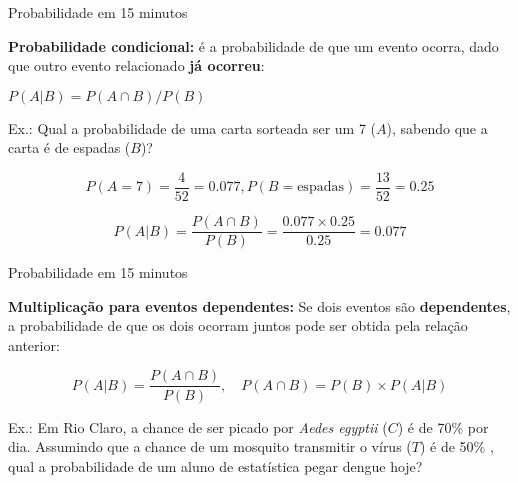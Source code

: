 \documentclass{beamer}\usepackage[]{graphicx}\usepackage[]{color}
\begin{document}
\begin{frame}{Probabilidade em 15 minutos}

\begin{small}

\textbf{Probabilidade condicional:} é a probabilidade de que um evento ocorra, dado que outro evento relacionado \textbf{já ocorreu}:

$P(A|B) = P(A \cap B)/P(B)$

\alert{Ex.:} Qual a probabilidade de uma carta sorteada ser um 7 ($A$), sabendo que a carta é de espadas ($B$)? 

\begin{equation*}
    P(A=7)= \frac{4}{52} = 0.077, P(B = \text{espadas}) = \frac{13}{52} = 0.25
\end{equation*}

\begin{equation*}
    P(A|B) = \frac{P(A \cap B)}{P(B)} = \frac{0.077 \times 0.25}{0.25} = 0.077
\end{equation*}


\end{small}

\end{frame} 



\begin{frame}{Probabilidade em 15 minutos}

\textbf{Multiplicação para eventos dependentes:} Se dois eventos são \textbf{dependentes}, a probabilidade de que os dois ocorram juntos pode ser obtida pela relação anterior: 

\begin{equation*}
    P(A|B) = \frac{P(A \cap B)}{P(B)},  \quad P(A \cap B) = P(B) \times P(A|B)
\end{equation*}

\alert{Ex.:} Em Rio Claro, a chance de ser picado por \emph{Aedes egyptii} ($C$) é de 70\% por dia. Assumindo que a chance de um mosquito transmitir o vírus ($T$) é de 50\% , qual a probabilidade de um aluno de estatística pegar dengue hoje?



\end{frame} 
\end{document}
